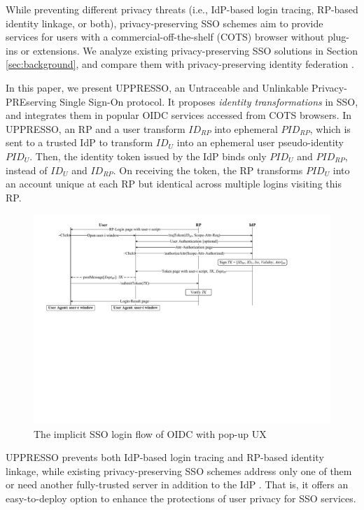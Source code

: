 While preventing different privacy threats (i.e., IdP-based login tracing, RP-based identity linkage, or both),
privacy-preserving SSO schemes \cite{maler2008venn, NIST2017draft, BrowserID, save-flow, SPRESSO,miso,POIDC} aim to provide services for users with a commercial-off-the-shelf (COTS) browser without plug-ins or extensions.
We analyze existing privacy-preserving SSO solutions in Section \ref{sec:background},
    and compare them with privacy-preserving identity federation \cite{PseudoID, ELPASSO, UnlimitID, Opaak, uprov, hyperledge-idemix}.

In this paper, we present UPPRESSO, an Untraceable and Unlinkable Privacy-PREserving Single Sign-On protocol.
It proposes {\em identity transformations} in SSO,
 and integrates them in popular OIDC services accessed from COTS browsers.
In UPPRESSO, an RP and a user transform $ID_{RP}$ into ephemeral $PID_{RP}$, which is sent to a trusted IdP to transform $ID_U$ into an ephemeral user pseudo-identity $PID_U$.
Then, the identity token issued by the IdP binds only $PID_U$ and $PID_{RP}$, instead of $ID_U$ and $ID_{RP}$. On receiving the token, %
 the RP transforms $PID_U$ into an account unique at each RP but identical across multiple logins visiting this RP.


\begin{figure}[tb]
  \centering
  \includegraphics[width=0.875\linewidth]{fig/OIDC-pop.pdf}
  \caption{The implicit SSO login flow of OIDC with pop-up UX}
  \label{fig:OpenID}
\end{figure}

UPPRESSO prevents both IdP-based login tracing and RP-based identity linkage, while existing privacy-preserving SSO schemes address only one of them \cite{BrowserID, SPRESSO, NIST2017draft, save-flow,POIDC} or need another fully-trusted server in addition to the IdP \cite{miso,SPRESSO}.
That is, it offers an easy-to-deploy option to enhance the protections of user privacy for SSO services.


